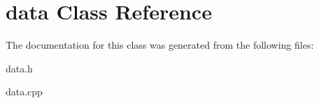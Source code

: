 \hypertarget{classdata}{}\section{data Class Reference}
\label{classdata}


The documentation for this class was generated from the following files\+:\begin{DoxyCompactItemize}
\item 
data.\+h\item 
data.\+cpp\end{DoxyCompactItemize}
